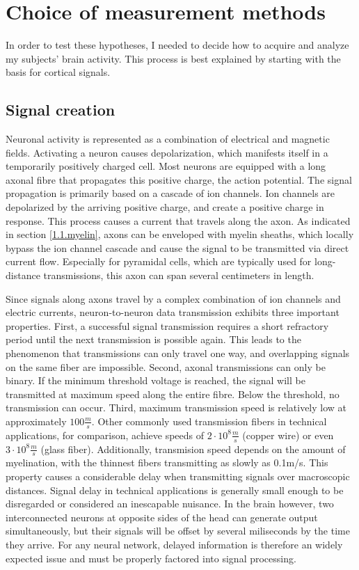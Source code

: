\section{Choice of measurement methods}\label{1.5}

In order to test these hypotheses, I needed to decide how to acquire and analyze my subjects' brain activity.
This process is best explained by starting with the basis for cortical signals.

\subsection{Signal creation}
Neuronal activity is represented as a combination of electrical and magnetic fields.
Activating a neuron causes depolarization, which manifests itself in a temporarily positively charged cell.
Most neurons are equipped with a long axonal fibre that propagates this positive charge, the action potential.
The signal propagation is primarily based on a cascade of ion channels.
Ion channels are depolarized by the arriving positive charge, and create a positive charge in response.
This process causes a current that travels along the axon.
As indicated in section \ref{1.1.myelin}, axons can be enveloped with myelin sheaths, which locally bypass the ion channel cascade and cause the signal to be transmitted via direct current flow.
Especially for pyramidal cells, which are typically used for long-distance transmissions, this axon can span several centimeters in length.

Since signals along axons travel by a complex combination of ion channels and electric currents, neuron-to-neuron data transmission exhibits three important properties.
First, a successful signal transmission requires a short refractory period until the next transmission is possible again.
This leads to the phenomenon that transmissions can only travel one way, and overlapping signals on the same fiber are impossible.
Second, axonal transmissions can only be binary.
If the minimum threshold voltage is reached, the signal will be transmitted at maximum speed along the entire fibre.
Below the threshold, no transmission can occur.
Third, maximum transmission speed is relatively low at approximately $100\frac{m}{s}$.
Other commonly used transmission fibers in technical applications, for comparison, achieve speeds of $2\cdot10^8\frac{m}{s}$ (copper wire) or even $3\cdot10^8\frac{m}{s}$ (glass fiber).
Additionally, transmision speed depends on the amount of myelination, with the thinnest fibers transmitting as slowly as 0.1m/s.
This property causes a considerable delay when transmitting signals over macroscopic distances.
Signal delay in technical applications is generally small enough to be disregarded or considered an inescapable nuisance.
In the brain however, two interconnected neurons at opposite sides of the head can generate output simultaneously, but their signals will be offset by several miliseconds by the time they arrive.
For any neural network, delayed information is therefore an widely expected issue and must be properly factored into signal processing.

